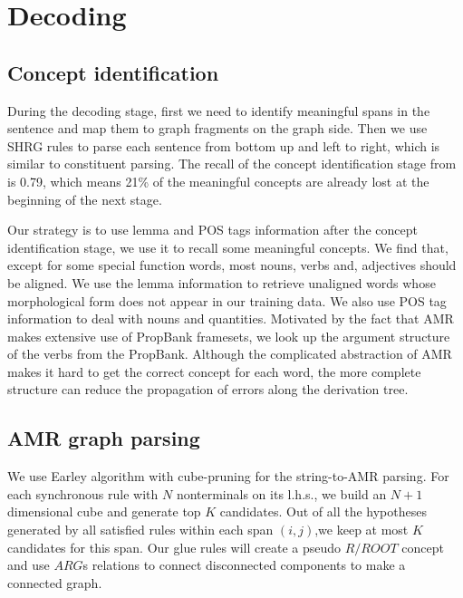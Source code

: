 \section{Decoding}
\subsection{Concept identification}
During the decoding stage, first we need to identify meaningful spans in the sentence and map them to graph fragments on the graph side. Then we use SHRG rules to
parse each sentence from bottom up and left to right, which is similar to constituent parsing. The recall of the concept identification stage from  is 0.79, which means 21\% of the meaningful concepts are already lost at the beginning of the next stage. 


Our strategy is to use lemma and POS tags information after the concept identification stage, we use it to recall some meaningful
concepts. We find that, except for some special function words, most nouns, verbs and, adjectives
should be aligned. We use the lemma information to retrieve unaligned words whose morphological form does not appear in our training data. 
We also use POS tag information to deal with nouns and quantities. Motivated by the fact that AMR makes extensive use of PropBank framesets,
we look up the argument structure of the verbs from the PropBank. Although the complicated abstraction of AMR
makes it hard to get the correct concept for each word, the more complete structure can reduce the propagation of errors along the derivation tree.


\subsection{AMR graph parsing}\label{sec:decode}
We use Earley algorithm with cube-pruning \cite{ChiangCL} for the string-to-AMR parsing. 
For each synchronous rule with $N$ nonterminals on its l.h.s., we build an $N+1$ dimensional cube and generate top $K$ candidates. 
Out of all the hypotheses generated by all satisfied rules within each span $(i,j)$,we keep at most $K$ candidates for this span.
Our glue rules will create a pseudo $R/ROOT$ concept and use $ARG$s relations to connect
disconnected components to make a connected graph.


